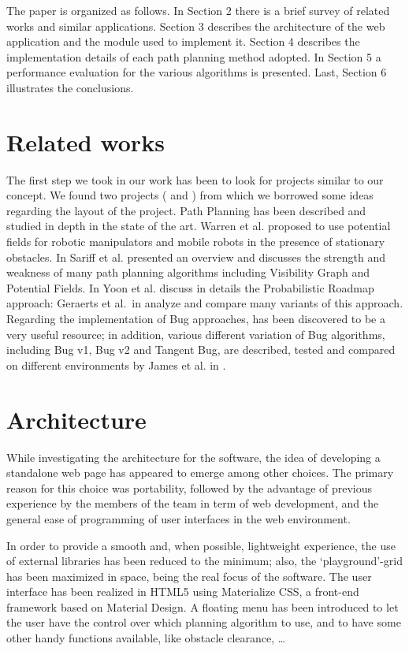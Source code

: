 \documentclass[conference]{IEEEtran}
\begin{document}
The paper is organized as follows. In Section 2 there is a brief survey of related works and similar applications. Section 3 describes the architecture of the web application and the module used to implement it. Section 4 describes the implementation details of each path planning method adopted. In Section 5 a performance evaluation for the various algorithms is presented. Last, Section 6 illustrates the conclusions.

\section{Related works}
The first step we took in our work has been to look for projects similar to our concept. We found two projects (\cite{l1-path-finder} and \cite{PathFinding.js}) from which we borrowed some ideas regarding the layout of the project.
Path Planning has been described and studied in depth in the state of the art. Warren et al. \cite{warren1989global} proposed to use potential fields for robotic manipulators and mobile robots in the presence of stationary obstacles. In \cite{sariff2006overview} Sariff et al. presented an overview and discusses the strength and weakness of many path planning algorithms including Visibility Graph and Potential Fields. In \cite{yoonprobabilistic} Yoon et al. discuss in details the Probabilistic Roadmap approach: Geraerts et al.\ in \cite{geraerts2004comparative} analyze and compare many variants of this approach.
Regarding the implementation of Bug approaches, \cite{tgBugSlides} has been discovered to be a very useful resource; in addition, various different variation of Bug algorithms, including Bug v1, Bug v2 and Tangent Bug, are described, tested and compared on different environments by James et al. in \cite{ng2007performance}.

\section{Architecture}
While investigating the architecture for the software, the idea of developing a standalone web page has appeared to emerge among other choices. The primary reason for this choice was portability, followed by the advantage of previous experience by the members of the team in term of web development, and the general ease of programming of user interfaces in the web environment.

In order to provide a smooth and, when possible, lightweight experience, the use of external libraries has been reduced to the minimum; also, the `playground'-grid has been maximized in space, being the real focus of the software. The user interface has been realized in HTML5 using Materialize CSS, a front-end framework based on Material Design. A floating menu has been introduced to let the user have the control over which planning algorithm to use, and to have some other handy functions available, like obstacle clearance, \dots
\end{document}
